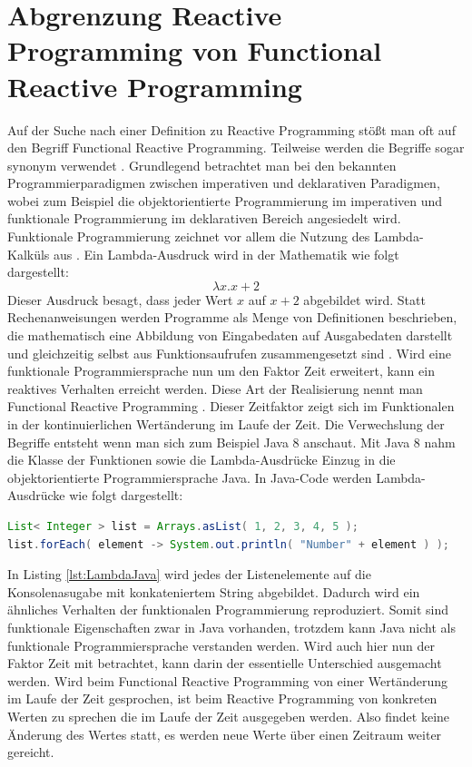 \section{Abgrenzung Reactive Programming von Functional Reactive Programming}
Auf der Suche nach einer Definition zu Reactive Programming stößt man oft auf den Begriff Functional Reactive Programming. Teilweise werden die Begriffe sogar synonym verwendet \cite{Nurkiewicz.2017}. Grundlegend betrachtet man bei den bekannten Programmierparadigmen zwischen imperativen und deklarativen Paradigmen, wobei zum Beispiel die objektorientierte Programmierung im imperativen und funktionale Programmierung im deklarativen Bereich angesiedelt wird. Funktionale Programmierung zeichnet vor allem die Nutzung des Lambda-Kalküls aus \cite{lamdakalk}. Ein Lambda-Ausdruck wird in der Mathematik wie folgt dargestellt:
\begin{displaymath}
\lambda x.x+2
\end{displaymath}
Dieser Ausdruck besagt, dass jeder Wert $x$ auf $x+2$ abgebildet wird.
Statt Rechenanweisungen werden Programme als Menge von Definitionen beschrieben, die mathematisch eine Abbildung von Eingabedaten auf Ausgabedaten darstellt und gleichzeitig selbst aus Funktionsaufrufen zusammengesetzt sind \cite{fpwiki}. Wird eine funktionale Programmiersprache nun um den Faktor Zeit erweitert, kann ein reaktives Verhalten erreicht werden. Diese Art der Realisierung nennt man Functional Reactive Programming \cite{hsklwiki}. Dieser Zeitfaktor zeigt sich im Funktionalen in der kontinuierlichen Wertänderung im Laufe der Zeit. Die Verwechslung der Begriffe entsteht wenn man sich zum Beispiel Java 8 anschaut. Mit Java 8 nahm die Klasse der Funktionen sowie die Lambda-Ausdrücke Einzug in die objektorientierte Programmiersprache Java. In Java-Code werden Lambda-Ausdrücke wie folgt dargestellt:
\begin{lstlisting}[language=java, caption={Lambda Beispiel in Java}, float=hbt, label=lst:LambdaJava, frame=single]
List< Integer > list = Arrays.asList( 1, 2, 3, 4, 5 );
list.forEach( element -> System.out.println( "Number" + element ) );
\end{lstlisting}
In Listing \ref{lst:LambdaJava} wird jedes der Listenelemente auf die Konsolenasugabe mit konkateniertem String abgebildet. Dadurch wird ein ähnliches Verhalten der funktionalen Programmierung reproduziert. Somit sind funktionale Eigenschaften zwar in Java vorhanden, trotzdem kann Java nicht als funktionale Programmiersprache verstanden werden. Wird auch hier nun der Faktor Zeit mit betrachtet, kann darin der essentielle Unterschied ausgemacht werden. Wird beim Functional Reactive Programming von einer Wertänderung im Laufe der Zeit gesprochen, ist beim Reactive Programming von konkreten Werten zu sprechen die im Laufe der Zeit ausgegeben werden. Also findet keine Änderung des Wertes statt, es werden neue Werte über einen Zeitraum weiter gereicht. 